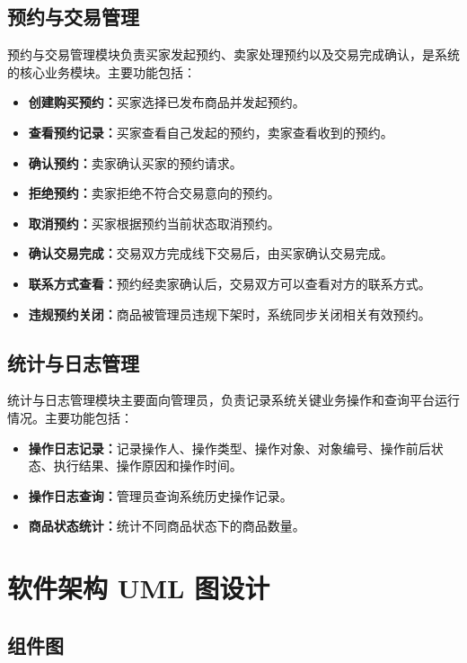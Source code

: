 \documentclass[12pt,a4paper]{article}
\begin{document}
	\subsection{预约与交易管理}
	
	预约与交易管理模块负责买家发起预约、卖家处理预约以及交易完成确认，是系统的核心业务模块。主要功能包括：
	\begin{itemize}
		\item \textbf{创建购买预约：}买家选择已发布商品并发起预约。
		\item \textbf{查看预约记录：}买家查看自己发起的预约，卖家查看收到的预约。
		\item \textbf{确认预约：}卖家确认买家的预约请求。
		\item \textbf{拒绝预约：}卖家拒绝不符合交易意向的预约。
		\item \textbf{取消预约：}买家根据预约当前状态取消预约。
		\item \textbf{确认交易完成：}交易双方完成线下交易后，由买家确认交易完成。
		\item \textbf{联系方式查看：}预约经卖家确认后，交易双方可以查看对方的联系方式。
		\item \textbf{违规预约关闭：}商品被管理员违规下架时，系统同步关闭相关有效预约。
	\end{itemize}
	
	\subsection{统计与日志管理}
	
	统计与日志管理模块主要面向管理员，负责记录系统关键业务操作和查询平台运行情况。主要功能包括：
	\begin{itemize}
		\item \textbf{操作日志记录：}记录操作人、操作类型、操作对象、对象编号、操作前后状态、执行结果、操作原因和操作时间。
		\item \textbf{操作日志查询：}管理员查询系统历史操作记录。
		\item \textbf{商品状态统计：}统计不同商品状态下的商品数量。
	\end{itemize}
	
	\section{软件架构 UML 图设计}
	
	\subsection{组件图}
\end{document}
